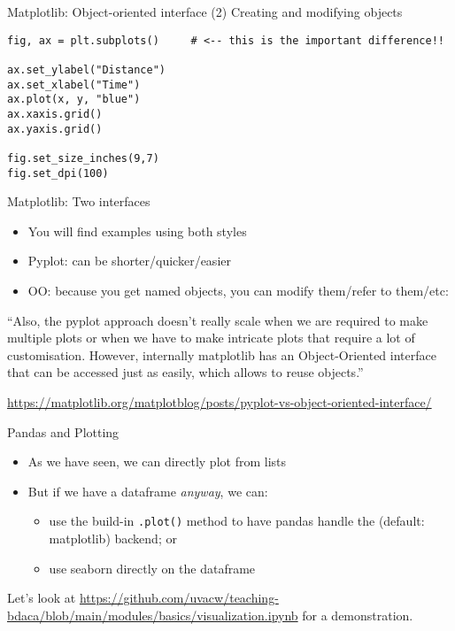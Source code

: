 \begin{frame}[fragile]{Matplotlib: Object-oriented interface}
(2) Creating and modifying objects
\begin{verbatim}
fig, ax = plt.subplots()     # <-- this is the important difference!!

ax.set_ylabel("Distance")
ax.set_xlabel("Time")
ax.plot(x, y, "blue")
ax.xaxis.grid()
ax.yaxis.grid()

fig.set_size_inches(9,7)
fig.set_dpi(100)
\end{verbatim}

\end{frame}



\begin{frame}{Matplotlib: Two interfaces}
  \begin{itemize}
  \item You will find examples using both styles
  \item Pyplot: can be shorter/quicker/easier
  \item OO: because you get named objects, you can modify them/refer to them/etc:
  \end{itemize}

  \pause

  ``Also, the pyplot approach doesn't really scale when we are required to make multiple plots or when we have to make intricate plots that require a lot of customisation. However, internally matplotlib has an Object-Oriented interface that can be accessed just as easily, which allows to reuse objects.''

  \tiny \url{https://matplotlib.org/matplotblog/posts/pyplot-vs-object-oriented-interface/}
  
\end{frame}


\begin{frame}{Pandas and Plotting}
  \begin{itemize}
  \item As we have seen, we can directly plot from lists
  \item But if we have a dataframe \emph{anyway}, we can:
    \begin{itemize}
    \item use the build-in \texttt{.plot()} method to have pandas handle the (default: matplotlib) backend; or
    \item use seaborn directly on the dataframe
    \end{itemize}
  \end{itemize}
\end{frame}

\begin{frame}[standout]
Let's look at \url{https://github.com/uvacw/teaching-bdaca/blob/main/modules/basics/visualization.ipynb} for a demonstration.
\end{frame}
